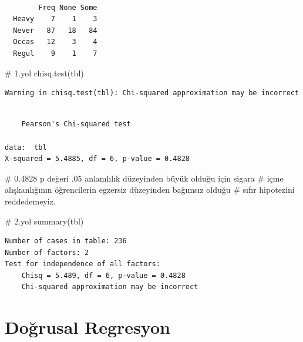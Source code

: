 \documentclass[
  letterpaper,
  DIV=11,
  numbers=noendperiod]{scrreprt}
\newenvironment{Shaded}{\begin{snugshade}}{\end{snugshade}}
\newcommand{\CommentTok}[1]{\textcolor[rgb]{0.37,0.37,0.37}{#1}}
\newcommand{\FunctionTok}[1]{\textcolor[rgb]{0.28,0.35,0.67}{#1}}
\newcommand{\NormalTok}[1]{\textcolor[rgb]{0.00,0.23,0.31}{#1}}
\begin{document}
\begin{verbatim}
       
        Freq None Some
  Heavy    7    1    3
  Never   87   18   84
  Occas   12    3    4
  Regul    9    1    7
\end{verbatim}

\begin{Shaded}
\begin{Highlighting}[]
\CommentTok{\# 1.yol}
\FunctionTok{chisq.test}\NormalTok{(tbl) }
\end{Highlighting}
\end{Shaded}

\begin{verbatim}
Warning in chisq.test(tbl): Chi-squared approximation may be incorrect
\end{verbatim}

\begin{verbatim}

    Pearson's Chi-squared test

data:  tbl
X-squared = 5.4885, df = 6, p-value = 0.4828
\end{verbatim}

\begin{Shaded}
\begin{Highlighting}[]
\CommentTok{\# 0.4828 p değeri .05 anlamlılık düzeyinden büyük olduğu için sigara }
\CommentTok{\# içme alışkanlığının öğrencilerin egzersiz düzeyinden bağımsız olduğu }
\CommentTok{\# sıfır hipotezini reddedemeyiz.}

\CommentTok{\# 2.yol}
\FunctionTok{summary}\NormalTok{(tbl)}
\end{Highlighting}
\end{Shaded}

\begin{verbatim}
Number of cases in table: 236 
Number of factors: 2 
Test for independence of all factors:
    Chisq = 5.489, df = 6, p-value = 0.4828
    Chi-squared approximation may be incorrect
\end{verbatim}


\hypertarget{doux11frusal-regresyon}{%
\chapter*{Doğrusal Regresyon}\label{doux11frusal-regresyon}}

\end{document}
